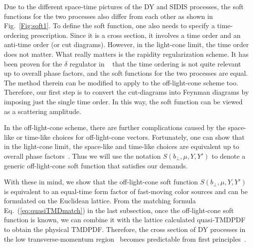 \documentclass[aps,rmp,reprint,amsmath,amssymb,graphicx,longbibliography]{revtex4-1} %
\begin{document}
Due to the different space-time pictures of the DY and SIDIS processes, the soft functions for the two processes also differ from each other as shown in Fig.~\ref{Fig:soft1}. To define the soft function, one also needs to specify a time-ordering prescription. Since it is a cross section, it involves a time order and an anti-time order (or cut diagrams). However, in the light-cone limit, the time order does not matter.
What really matters is the rapidity regularization scheme. It has been proven for the $\delta$ regulator in ~\cite{Vladimirov:2017ksc} that the time ordering is not quite relevant up to overall phase factors, and the soft functions for the two processes are equal. The method therein can be modified to apply to the off-light-cone scheme too. Therefore, our first step is to convert the cut-diagrams into Feynman diagrams by imposing just
the single time order. In this way, the soft function can be viewed as a scattering amplitude.

In the off-light-cone scheme, there are further complications caused by the space-like or
time-like choices for off-light-cone vectors. Fortunately, one can show that in the light-cone limit, the space-like and time-like choices
are equivalent up to overall phase factors~\cite{future}. Thus we will use the notation $S(b_\perp,\mu,Y,Y')$ to denote a generic off-light-cone soft function that satisfies our demands.

With these in mind, we show that the off-light-cone soft function $S(b_\perp,\mu,Y,Y')$ is equivalent to an equal-time form factor of fast-moving color sources and can be formulated on the Euclidean lattice. From the matching formula Eq.~(\ref{eq:quasiTMDmatch}) in the last subsection, once the off-light-cone soft function is known, we can combine it with the lattice calculated quasi-TMDPDF to obtain the physical TMDPDF. Therefore, the cross section of DY processes in the low transverse-momentum region~\cite{Collins:1984kg} becomes predictable from first principles~\cite{Ji:2019sxk}.
\end{document}
